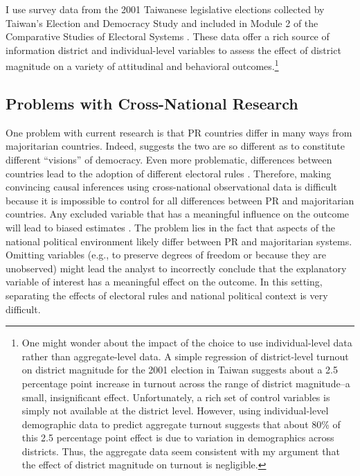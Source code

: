 \documentclass[12pt]{article}
\begin{document}
I use survey data from the 2001 Taiwanese legislative elections collected by Taiwan's Election and Democracy Study and included in Module 2 of the Comparative Studies of Electoral Systems \citep{cses2}. These data offer a rich source of information district and individual-level variables to assess the effect of district magnitude on a variety of attitudinal and behavioral outcomes.\footnote{One might wonder about the impact of the choice to use individual-level data rather than aggregate-level data. A simple regression of district-level turnout on district magnitude for the 2001 election in Taiwan suggests about a 2.5 percentage point increase in turnout across the range of district magnitude--a small, insignificant effect. Unfortunately, a rich set of control variables is simply not available at the district level. However, using individual-level demographic data to predict aggregate turnout suggests that about 80\% of this 2.5 percentage point effect is due to variation in demographics across districts. Thus, the aggregate data seem consistent with my argument that the effect of district magnitude on turnout is negligible.} 

\subsection*{Problems with Cross-National Research}

One problem with current research is that PR countries differ in many ways from majoritarian countries. Indeed, \cite{Powell2000} suggests the two are so different as to constitute different ``visions'' of democracy. Even more problematic, differences between countries lead to the adoption of different electoral rules \citep{BlaisDobrzynskaIndridason, Boix1999}. Therefore, making convincing causal inferences using cross-national observational data is difficult because it is impossible to control for all differences between PR and majoritarian countries. Any excluded variable that has a meaningful influence on the outcome will lead to biased estimates \citep{Greene2008}. The problem lies in the fact that aspects of the national political environment likely differ between PR and majoritarian systems. Omitting variables (e.g., to preserve degrees of freedom or because they are unobserved) might lead the analyst to incorrectly conclude that the explanatory variable of interest has a meaningful effect on the outcome. In this setting, separating the effects of electoral rules and national political context is very difficult.
\end{document}
